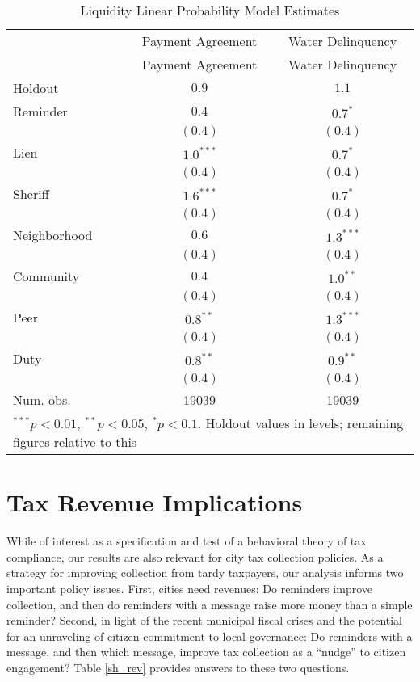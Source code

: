 \documentclass[12pt]{article}
\begin{document}
\begin{table}[htb]
\caption{Liquidity Linear Probability Model Estimates}
\begin{center}
\begin{tabular}{l c c }
\hline
 & \multicolumn{1}{c}{Payment Agreement} & \multicolumn{1}{c}{Water Delinquency} \\
 & Payment Agreement & Water Delinquency \\
Holdout      & $0.9$ & $1.1$ \\
\hline
Reminder     & $0.4$       & $0.7^{*}$   \\
             & $(0.4)$     & $(0.4)$     \\
Lien         & $1.0^{***}$ & $0.7^{*}$   \\
             & $(0.4)$     & $(0.4)$     \\
Sheriff      & $1.6^{***}$ & $0.7^{*}$   \\
             & $(0.4)$     & $(0.4)$     \\
Neighborhood & $0.6$       & $1.3^{***}$ \\
             & $(0.4)$     & $(0.4)$     \\
Community    & $0.4$       & $1.0^{**}$  \\
             & $(0.4)$     & $(0.4)$     \\
Peer         & $0.8^{**}$  & $1.3^{***}$ \\
             & $(0.4)$     & $(0.4)$     \\
Duty         & $0.8^{**}$  & $0.9^{**}$  \\
             & $(0.4)$     & $(0.4)$     \\
\hline
Num. obs.    & 19039       & 19039       \\
\hline
\multicolumn{3}{l}{\scriptsize{$^{***}p<0.01$, $^{**}p<0.05$, $^*p<0.1$. Holdout values in levels; remaining figures relative to this}}
\end{tabular}
\label{waterrelholdout}
\end{center}
\end{table}

\section{Tax Revenue Implications}

While of interest as a specification and test of a behavioral theory
of tax compliance, our results are also relevant for city tax
collection policies.  As a strategy for improving collection from
tardy taxpayers, our analysis informs two important policy issues.
First, cities need revenues: Do reminders improve collection, and then
do reminders with a message raise more money than a simple reminder?
Second, in light of the recent municipal fiscal crises and the
potential for an unraveling of citizen commitment to local governance:
Do reminders with a message, and then which message, improve tax
collection as a ``nudge'' to citizen engagement? Table \ref{sh_rev}
provides answers to these two questions.
\end{document}
